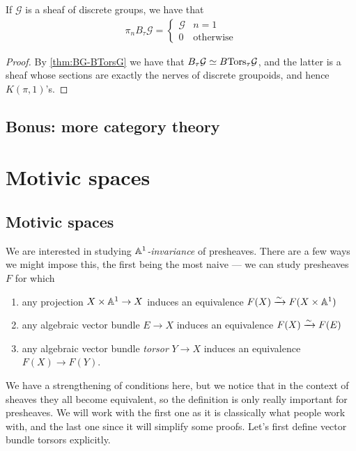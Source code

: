 \documentclass[11pt,openany]{book}
\begin{document}
\begin{example} If $\mathcal{G}$ is a sheaf of discrete groups, we have that
\begin{align*}
    \pi_n B_\tau \mathcal{G} = \begin{cases}
    \mathcal{G} & n=1 \\
    0 & \text{otherwise}
    \end{cases}
\end{align*}
\end{example}
\begin{proof} By \autoref{thm:BG-BTorsG} we have that $B_\tau \mathcal{G} \simeq B\mathrm{Tors}_\tau \mathcal{G}$, and the latter is a sheaf whose sections are exactly the nerves of discrete groupoids, and hence $K(\pi,1)$'s.
\end{proof}


\section{Bonus: more category theory}




\chapter{Motivic spaces}
\minitoc
\section{Motivic spaces}

We are interested in studying \textit{$\mathbb{A}^1$-invariance} of presheaves. There are a few ways we might impose this, the first being the most naive --- we can study presheaves $F$ for which
\begin{enumerate}
    \item any projection $X \times \mathbb{A}^1 \to X$ induces an equivalence $F(X) \xrightarrow{\sim} F(X \times \mathbb{A}^1)$
    \item any algebraic vector bundle $E \to X$ induces an equivalence $F(X) \xrightarrow{\sim} F(E)$
    \item any algebraic vector bundle \textit{torsor} $Y \to X$ induces an equivalence $F(X) \to F(Y)$.
\end{enumerate}
We have a strengthening of conditions here, but we notice that in the context of sheaves they all become equivalent, so the definition is only really important for presheaves. We will work with the first one as it is classically what people work with, and the last one since it will simplify some proofs. Let's first define vector bundle torsors explicitly.
\end{document}
